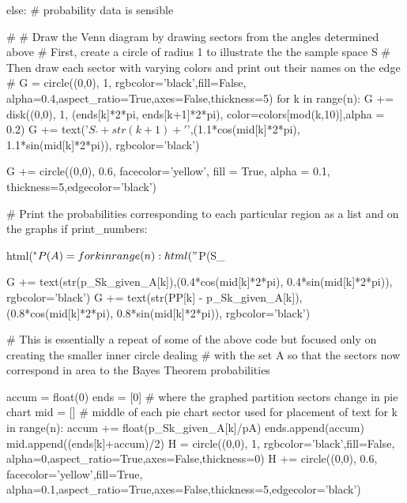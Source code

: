 \documentclass[10pt,]{book}
\numberwithin{equation}{section}
\begin{document}
\begin{sageinput}
        else:                           # probability data is sensible
 
#        
#  Draw the Venn diagram by drawing sectors from the angles determined above
#  First, create a circle of radius 1 to illustrate the the sample space S
#  Then draw each sector with varying colors and print out their names on the edge
#
            G = circle((0,0), 1, rgbcolor='black',fill=False, alpha=0.4,aspect_ratio=True,axes=False,thickness=5)
            for k in range(n):
                G += disk((0,0), 1, (ends[k]*2*pi, ends[k+1]*2*pi), color=colors[mod(k,10)],alpha = 0.2)
                G += text('$S_'+str(k+1)+'$',(1.1*cos(mid[k]*2*pi), 1.1*sin(mid[k]*2*pi)), rgbcolor='black')
                
            G += circle((0,0), 0.6, facecolor='yellow', fill = True, alpha = 0.1, thickness=5,edgecolor='black') 
    
#  Print the probabilities corresponding to each particular region as a list and on the graphs
            if print_numbers:               

                html("$P(A) = %
                for k in range(n):
                    html("$P(S_{%
                                        
                    G += text(str(p_Sk_given_A[k]),(0.4*cos(mid[k]*2*pi), 0.4*sin(mid[k]*2*pi)), rgbcolor='black')
                    G += text(str(PP[k] - p_Sk_given_A[k]),(0.8*cos(mid[k]*2*pi), 0.8*sin(mid[k]*2*pi)), rgbcolor='black')
        
#  This is essentially a repeat of some of the above code but focused only on creating the smaller inner circle dealing
#  with the set A so that the sectors now correspond in area to the Bayes Theorem probabilities


            accum = float(0)                        
            ends = [0]                     # where the graphed partition sectors change in pie chart 
            mid = []                       # middle of each pie chart sector used for placement of text
            for k in range(n): 
                accum += float(p_Sk_given_A[k]/pA) 
                ends.append(accum)
                mid.append((ends[k]+accum)/2)
            H = circle((0,0), 1, rgbcolor='black',fill=False, alpha=0,aspect_ratio=True,axes=False,thickness=0)
            H += circle((0,0), 0.6, facecolor='yellow',fill=True, alpha=0.1,aspect_ratio=True,axes=False,thickness=5,edgecolor='black')
            
}
\end{sageinput}
\end{document}
